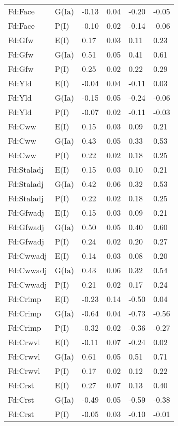 \begin{center}
\begin{longtable}{|p{1.1in}|p{0.7in}|p{0.7in}|p{0.6in}|p{0.6in}|p{0.6in}|}
  Fd:Face & G(Ia) & -0.13 & 0.04 & -0.20 & -0.05 \\ 
  Fd:Face & P(I) & -0.10 & 0.02 & -0.14 & -0.06 \\ 
  Fd:Gfw & E(I) & 0.17 & 0.03 & 0.11 & 0.23 \\ 
  Fd:Gfw & G(Ia) & 0.51 & 0.05 & 0.41 & 0.61 \\ 
  Fd:Gfw & P(I) & 0.25 & 0.02 & 0.22 & 0.29 \\ 
  Fd:Yld & E(I) & -0.04 & 0.04 & -0.11 & 0.03 \\ 
  Fd:Yld & G(Ia) & -0.15 & 0.05 & -0.24 & -0.06 \\ 
  Fd:Yld & P(I) & -0.07 & 0.02 & -0.11 & -0.03 \\ 
  Fd:Cww & E(I) & 0.15 & 0.03 & 0.09 & 0.21 \\ 
  Fd:Cww & G(Ia) & 0.43 & 0.05 & 0.33 & 0.53 \\ 
  Fd:Cww & P(I) & 0.22 & 0.02 & 0.18 & 0.25 \\ 
  Fd:Staladj & E(I) & 0.15 & 0.03 & 0.10 & 0.21 \\ 
  Fd:Staladj & G(Ia) & 0.42 & 0.06 & 0.32 & 0.53 \\ 
  Fd:Staladj & P(I) & 0.22 & 0.02 & 0.18 & 0.25 \\ 
  Fd:Gfwadj & E(I) & 0.15 & 0.03 & 0.09 & 0.21 \\ 
  Fd:Gfwadj & G(Ia) & 0.50 & 0.05 & 0.40 & 0.60 \\ 
  Fd:Gfwadj & P(I) & 0.24 & 0.02 & 0.20 & 0.27 \\ 
  Fd:Cwwadj & E(I) & 0.14 & 0.03 & 0.08 & 0.20 \\ 
  Fd:Cwwadj & G(Ia) & 0.43 & 0.06 & 0.32 & 0.54 \\ 
  Fd:Cwwadj & P(I) & 0.21 & 0.02 & 0.17 & 0.24 \\ 
  Fd:Crimp & E(I) & -0.23 & 0.14 & -0.50 & 0.04 \\ 
  Fd:Crimp & G(Ia) & -0.64 & 0.04 & -0.73 & -0.56 \\ 
  Fd:Crimp & P(I) & -0.32 & 0.02 & -0.36 & -0.27 \\ 
  Fd:Crwvl & E(I) & -0.11 & 0.07 & -0.24 & 0.02 \\ 
  Fd:Crwvl & G(Ia) & 0.61 & 0.05 & 0.51 & 0.71 \\ 
  Fd:Crwvl & P(I) & 0.17 & 0.02 & 0.12 & 0.22 \\ 
  Fd:Crst & E(I) & 0.27 & 0.07 & 0.13 & 0.40 \\ 
  Fd:Crst & G(Ia) & -0.49 & 0.05 & -0.59 & -0.38 \\ 
  Fd:Crst & P(I) & -0.05 & 0.03 & -0.10 & -0.01 \\ 

\end{longtable}
\end{center}
